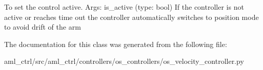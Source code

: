 \begin{DoxyVerb}To set the control active. 
Args: is_active (type: bool)
If the controller is not active or reaches time out
the controller automatically switches to position mode to avoid drift of the arm
\end{DoxyVerb}
 

The documentation for this class was generated from the following file\-:\begin{DoxyCompactItemize}
\item 
aml\-\_\-ctrl/src/aml\-\_\-ctrl/controllers/os\-\_\-controllers/os\-\_\-velocity\-\_\-controller.\-py\end{DoxyCompactItemize}

